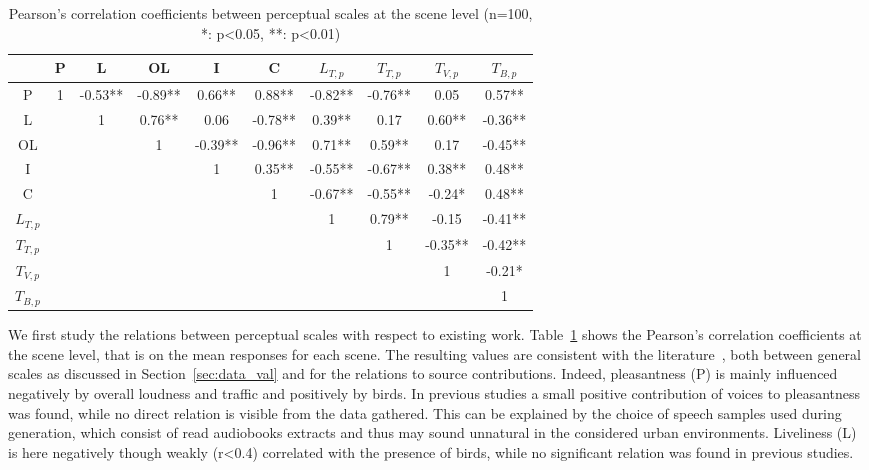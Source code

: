 \documentclass[11pt,a4paper]{article}
\begin{document}
\begin{table}[h]
\centering
\caption{Pearson's correlation coefficients between perceptual scales at the scene level (n=100, *: p<0.05, **: p<0.01)}
\label{tab:percc}
\begin{tabular}{ c | c c c c c c c c c }
\hline
	 & P & L & OL & I & C & $L_{T, p}$ & $T_{T, p}$ & $T_{V, p}$ & $T_{B, p}$ \\ \hline
	P & 1 & -0.53** & -0.89** & 0.66** & 0.88** & -0.82** & -0.76** & 0.05 & 0.57** \\
	L &  & 1 & 0.76** & 0.06 & -0.78** & 0.39** & 0.17 & 0.60** & -0.36** \\
	OL &  &  & 1 & -0.39** & -0.96** & 0.71** & 0.59** & 0.17 & -0.45** \\
	I &  &  &  & 1 & 0.35** & -0.55** & -0.67** & 0.38** & 0.48** \\
	C &  &  &  &  & 1 & -0.67** & -0.55** & -0.24* & 0.48** \\
	$L_{T, p}$ &  &  &  &  &  & 1 & 0.79** & -0.15 & -0.41** \\
	$T_{T, p}$ &  &  &  &  &  &  & 1 & -0.35** & -0.42** \\
	$T_{V, p}$ &  &  &  &  &  &  &  & 1 & -0.21* \\
	$T_{B, p}$ &  &  &  &  &  &  &  &  & 1 \\ \hline
\end{tabular}
\end{table}

We first study the relations between perceptual scales with respect to existing work. Table~\ref{tab:percc} shows the Pearson's correlation coefficients at the scene level, that is on the mean responses for each scene. The resulting values are consistent with the literature~\cite{aumond2017, gontier2018}, both between general scales as discussed in Section~\ref{sec:data_val} and for the relations to source contributions. Indeed, pleasantness (P) is mainly influenced negatively by overall loudness and traffic and positively by birds. In previous studies a small positive contribution of voices to pleasantness was found, while no direct relation is visible from the data gathered. This can be explained by the choice of speech samples used during generation, which consist of read audiobooks extracts and thus may sound unnatural in the considered urban environments. Liveliness (L) is here negatively though weakly (r<0.4) correlated with the presence of birds, while no significant relation was found in previous studies.\\
\end{document}
